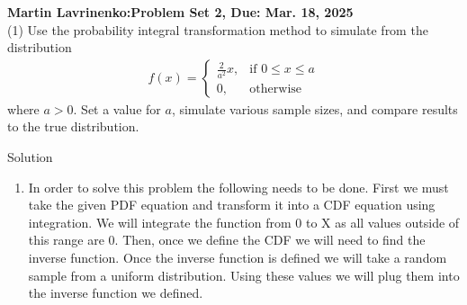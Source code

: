 \documentclass[final,11pt]{article}
\begin{document}
\thispagestyle{empty}
\begin{spacing}{1.25}

\textbf{Martin Lavrinenko:\hfill Problem Set 2, Due: Mar. 18, 2025}\\

(1) Use the probability integral transformation method to simulate from the distribution
\begin{gather}
    f(x) = 
    \begin{cases}
        \frac{2}{a^2}x,  & \text{if }0\leq x\leq a \\
        0, & \text{otherwise}
    \end{cases}
\end{gather}
where $a>0$. Set a value for $a$, simulate various sample sizes, and compare results to the true distribution.

Solution 
\begin{enumerate}
    \item In order to solve this problem the following needs to be done. First we must take the given PDF equation and transform it into a CDF equation using integration. We will integrate the function from 0 to X as all values outside of this range are 0. Then, once we define the CDF we will need to find the inverse function. Once the inverse function is defined we will take a random sample from a uniform distribution. Using these values we will plug them into the inverse function we defined.


\end{enumerate}
\end{spacing}
\end{document}

